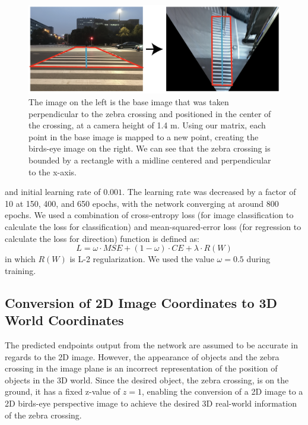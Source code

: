 \documentclass[runningheads]{llncs}
\begin{document}
\begin{figure}
\includegraphics[width=\textwidth]{figure2.png}
\caption{The image on the left is the base image that was taken perpendicular to the zebra crossing and positioned in the center of the crossing, at a camera height of 1.4 m. Using our matrix, each point in the base image is mapped to a new point, creating the birds-eye image on the right. We can see that the zebra crossing is bounded by a rectangle with a midline centered and perpendicular to the x-axis.}\label{figure3}
\end{figure}
and initial learning rate of $0.001$. The learning rate was decreased by a factor of 10 at 150, 400, and 650 epochs, with the network converging at around 800 epochs. We used a combination of cross-entropy loss (for image classification to calculate the loss for classification) and mean-squared-error loss (for regression to calculate the loss for direction) function is defined as:
\begin{equation}
L = \omega \cdot MSE + (1-\omega) \cdot CE + \lambda \cdot R(W)
\end{equation}
in which $R(W)$ is L-2 regularization. We used the value $\omega = 0.5$ during training. 

\subsection{Conversion of 2D Image Coordinates to 3D World Coordinates}
The predicted endpoints output from the network are assumed to be accurate in regards to the 2D image. However, the appearance of objects and the zebra crossing in the image plane is an incorrect representation of the position of objects in the 3D world. Since the desired object, the zebra crossing, is on the ground, it has a fixed z-value of $z=1$, enabling the conversion of a 2D image to a 2D birds-eye perspective image to achieve the desired 3D real-world information of the zebra crossing.
\end{document}
